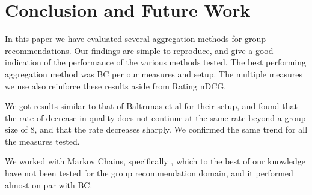 \section{Conclusion and Future Work}\label{sec:conclusion}
In this paper we have evaluated several aggregation methods for group recommendations. Our findings are simple to reproduce, and give a good indication of the performance of the various methods tested. The best performing aggregation method was BC per our measures and setup. The multiple measures we use also reinforce these results aside from Rating nDCG.

We got results similar to that of Baltrunas et al for their setup, and found that the rate of decrease in quality does not continue at the same rate beyond a group size of 8, and that the rate decreases sharply. We confirmed the same trend for all the measures tested.

We worked with Markov Chains, specifically \MC, which to the best of our knowledge have not been tested for the group recommendation domain, and it performed almost on par with BC.

%
%
%
%




